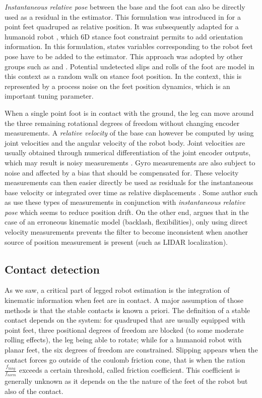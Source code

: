 \textit{Instantaneous relative pose} between the base and the foot can also be directly used as a residual in the estimator. This formulation
was introduced in \cite{bloesch2013state} for a point feet quadruped as relative position. It was subsequently adapted for a humanoid robot \cite{rotella2014state}, 
which 6D stance foot constraint permits to add orientation information. In this formulation, states variables corresponding to the robot feet pose have to 
be added to the estimator. This approach was adopted by other groups such as \cite{hartley2018legged, hartley2018hybrid, hartley2020contact} and \cite{bledt2018cheetah}.
Potential undetected slips and rolls of the foot are model in this context as a random walk on stance foot position. In the \KalmanF context, this is represented 
by a process noise on the feet position dynamics, which is an important tuning parameter.

When a single point foot is in contact with the ground, the leg can move around the three remaining rotational degrees of freedom without changing encoder measurements.
A \textit{relative velocity} of the base can however be computed by using joint velocities and the angular velocity of the robot body. 
Joint velocities are usually obtained through numerical differentiation of the joint encoder outputs, which may result is noisy measurements \cite{rotella2016imu}.
Gyro measurements are also subject to noise and affected by a bias that should be compensated for. These velocity measurements can then easier directly be used as
residuals for the instantaneous base velocity \cite{bloesch2013stateSlippery,bledt2018cheetah} or integrated over time as relative 
displacements \cite{ma2012robust, wisth2020preintegrated}. Some author such as \cite{bloesch2013stateSlippery, bledt2018cheetah} 
use these types of measurements in conjunction with \textit{instantaneous relative pose} which seems to reduce position drift. On the other end,
\cite{fallon2014drift} argues that in the case of an erroneous kinematic model (backlash, flexibilities), only using direct velocity measurements
prevents the filter to become inconsistent when another source of position measurement is present (such as LIDAR localization).  


\subsection{Contact detection}
As we saw, a critical part of legged robot estimation is the integration of kinematic information when feet are in contact. A major
assumption of those methods is that the stable contacts is known a priori. The definition of a stable contact depends on the system: for quadruped that 
are usually equipped with point feet, three positional degrees of freedom are blocked (to some moderate rolling effects), the leg being able to rotate; while for a humanoid robot with
planar feet, the six degrees of freedom are constrained. Slipping appears when the contact forces go outside of the coulomb friction cone, that is when the ration $\frac{f_{tang}}{f_{norm}}$
exceeds a certain threshold, called friction coefficient. This coefficient is generally unknown as it depends on the the nature of the feet of the robot but also of the contact.

